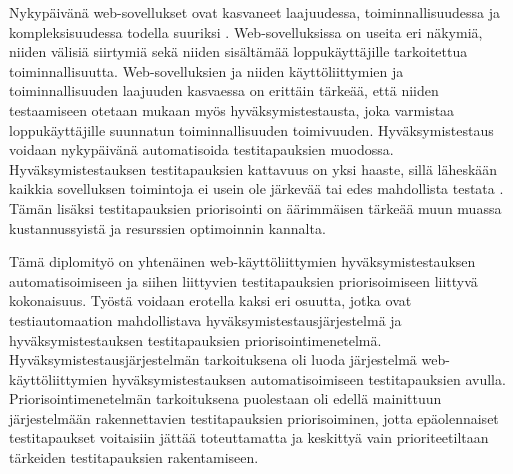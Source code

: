 Nykypäivänä web-sovellukset ovat kasvaneet laajuudessa, toiminnallisuudessa ja komp\-lek\-si\-suu\-des\-sa todella suuriksi \parencite{web_app_complexity}.
Web-sovelluksissa on useita eri näkymiä, niiden välisiä siirtymiä sekä niiden sisältämää loppukäyttäjille tarkoitettua toiminnallisuutta.
Web-sovelluksien ja niiden käyttöliittymien ja toiminnallisuuden laajuuden kasvaessa on erittäin tärkeää, että niiden testaamiseen otetaan mukaan myös hyväksymistestausta, joka varmistaa loppukäyttäjille suunnatun toiminnallisuuden toimivuuden.
Hyväksymistestaus voidaan nykypäivänä automatisoida testitapauksien muodossa.
Hyväksymistestauksen testitapauksien kattavuus on yksi haaste, sillä läheskään kaikkia sovelluksen toimintoja ei usein ole järkevää tai edes mahdollista testata \parencite{testing_possibility}.
Tämän lisäksi testitapauksien priorisointi on äärimmäisen tärkeää muun muassa kustannussyistä ja resurssien optimoinnin kannalta.

Tämä diplomityö on yhtenäinen web-käyttöliittymien hyväksymistestauksen automatisoimiseen ja siihen liittyvien testitapauksien priorisoimiseen liittyvä kokonaisuus.
Työstä voidaan erotella kaksi eri osuutta, jotka ovat testiautomaation mahdollistava hyväksymistestausjärjestelmä ja hyväksymistestauksen testitapauksien priorisointimenetelmä.
Hyväksymistestausjärjestelmän tarkoituksena oli luoda järjestelmä web-käyttöliittymien hyväksymistestauksen automatisoimiseen testitapauksien avulla.
Priorisointimenetelmän tarkoituksena puolestaan oli edellä mainittuun järjestelmään rakennettavien testitapauksien priorisoiminen, jotta epäolennaiset testitapaukset voitaisiin jättää toteuttamatta ja keskittyä vain prioriteetiltaan tärkeiden testitapauksien rakentamiseen.

